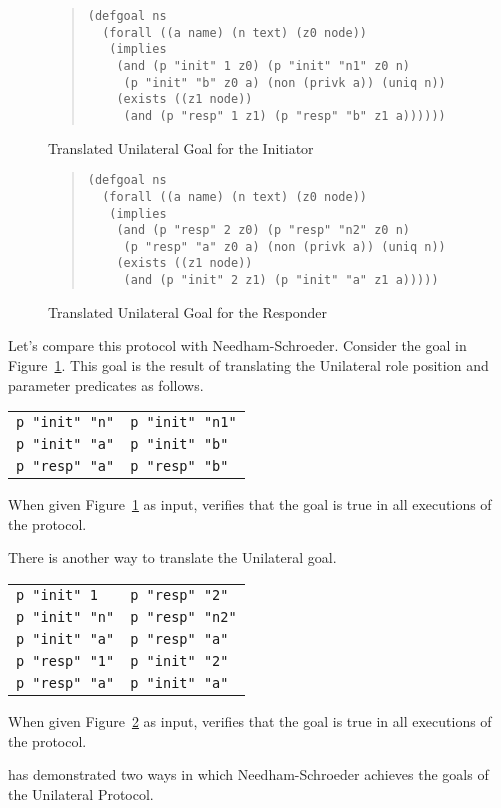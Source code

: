 \documentclass[12pt]{article}
\begin{document}
\begin{figure}
\begin{quote}
\begin{verbatim}
(defgoal ns
  (forall ((a name) (n text) (z0 node))
   (implies
    (and (p "init" 1 z0) (p "init" "n1" z0 n)
     (p "init" "b" z0 a) (non (privk a)) (uniq n))
    (exists ((z1 node))
     (and (p "resp" 1 z1) (p "resp" "b" z1 a))))))
\end{verbatim}
\end{quote}
\caption{Translated Unilateral Goal for the
  Initiator}\label{fig:unilateral ns init}
\end{figure}

\begin{figure}
\begin{quote}
\begin{verbatim}
(defgoal ns
  (forall ((a name) (n text) (z0 node))
   (implies
    (and (p "resp" 2 z0) (p "resp" "n2" z0 n)
     (p "resp" "a" z0 a) (non (privk a)) (uniq n))
    (exists ((z1 node))
     (and (p "init" 2 z1) (p "init" "a" z1 a)))))
\end{verbatim}
\end{quote}
\caption{Translated Unilateral Goal for the
  Responder}\label{fig:unilateral ns resp}
\end{figure}

Let's compare this protocol with Needham-Schroeder.  Consider the goal
in Figure~\ref{fig:unilateral ns init}.  This goal is the result of
translating the Unilateral role position and parameter predicates as
follows.
\begin{center}
\begin{tabular}{l@{$\quad\rightarrow\quad$}l}
  \texttt{p "init" "n"}&\texttt{p "init" "n1"}\\
  \texttt{p "init" "a"}&\texttt{p "init" "b"}\\
  \texttt{p "resp" "a"}&\texttt{p "resp" "b"}
\end{tabular}
\end{center}
When given Figure~\ref{fig:unilateral ns init} as input, {\cpsa}
verifies that the goal is true in all executions of the protocol.

There is another way to translate the Unilateral goal.
\begin{center}
\begin{tabular}{l@{$\quad\rightarrow\quad$}l}
  \texttt{p "init" 1}&\texttt{p "resp" "2"}\\
  \texttt{p "init" "n"}&\texttt{p "resp" "n2"}\\
  \texttt{p "init" "a"}&\texttt{p "resp" "a"}\\
  \texttt{p "resp" "1"}&\texttt{p "init" "2"}\\
  \texttt{p "resp" "a"}&\texttt{p "init" "a"}
\end{tabular}
\end{center}
When given Figure~\ref{fig:unilateral ns resp} as input, {\cpsa}
verifies that the goal is true in all executions of the protocol.

{\cpsa} has demonstrated two ways in which Needham-Schroeder achieves
the goals of the Unilateral Protocol.



\end{document}
